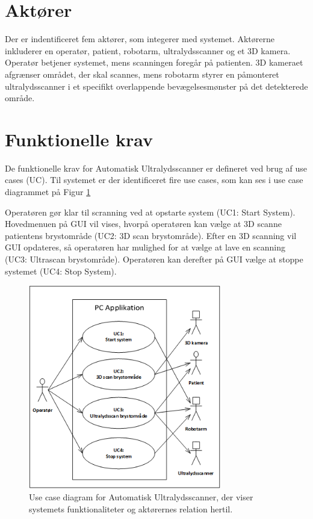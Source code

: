 \section{Aktører}
Der er indentificeret fem aktører, som integerer med systemet. Aktørerne inkluderer en operatør, patient, robotarm, ultralydsscanner og et 3D kamera. Operatør betjener systemet, mens scanningen foregår på patienten. 3D kameraet afgrænser området, der skal scannes, mens robotarm styrer en påmonteret ultralydsscanner i et specifikt overlappende bevægelsesmønster på det detekterede område.

\section{Funktionelle krav}
De funktionelle krav for Automatisk Ultralydsscanner er defineret ved brug af use cases (UC). Til systemet er der identificeret fire use cases, som kan ses i use case diagrammet på Figur \ref{UseCaseDiagram} 

Operatøren gør klar til scranning ved at opstarte system (UC1: Start System). Hovedmenuen på GUI vil vises, hvorpå operatøren kan vælge at 3D scanne patientens brystområde (UC2: 3D scan brystområde). Efter en 3D scanning vil GUI opdateres, så operatøren har mulighed for at vælge at lave en scanning (UC3: Ultrascan brystområde). Operatøren kan derefter på GUI vælge at stoppe systemet (UC4: Stop System). 

\begin{figure}[H]
    \centering
    \includegraphics[width=0.75\textwidth]{figurer/d/Kravspecifikation/UseCaseDiagram}
    \caption{Use case diagram for Automatisk Ultralydsscanner, der viser systemets funktionaliteter og aktørernes relation hertil.}
    \label{UseCaseDiagram}
\end{figure}

